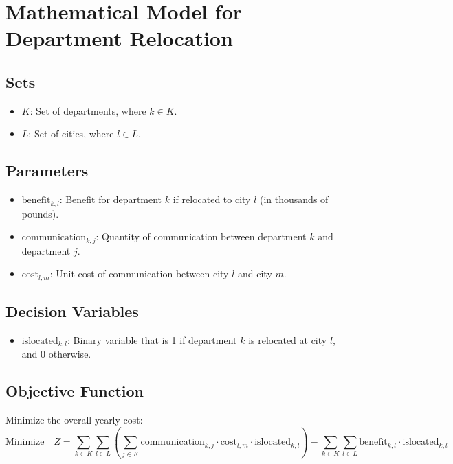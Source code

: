 \documentclass{article}
\begin{document}
\section*{Mathematical Model for Department Relocation}

\subsection*{Sets}
\begin{itemize}
    \item \( K \): Set of departments, where \( k \in K \).
    \item \( L \): Set of cities, where \( l \in L \).
\end{itemize}

\subsection*{Parameters}
\begin{itemize}
    \item \( \text{benefit}_{k,l} \): Benefit for department \( k \) if relocated to city \( l \) (in thousands of pounds).
    \item \( \text{communication}_{k,j} \): Quantity of communication between department \( k \) and department \( j \).
    \item \( \text{cost}_{l,m} \): Unit cost of communication between city \( l \) and city \( m \).
\end{itemize}

\subsection*{Decision Variables}
\begin{itemize}
    \item \( \text{islocated}_{k,l} \): Binary variable that is 1 if department \( k \) is relocated at city \( l \), and 0 otherwise.
\end{itemize}

\subsection*{Objective Function}
Minimize the overall yearly cost:
\[
\text{Minimize} \quad Z = \sum_{k \in K} \sum_{l \in L} \left( \sum_{j \in K} \text{communication}_{k,j} \cdot \text{cost}_{l,m} \cdot \text{islocated}_{k,l} \right) - \sum_{k \in K} \sum_{l \in L} \text{benefit}_{k,l} \cdot \text{islocated}_{k,l}
\]
\end{document}

